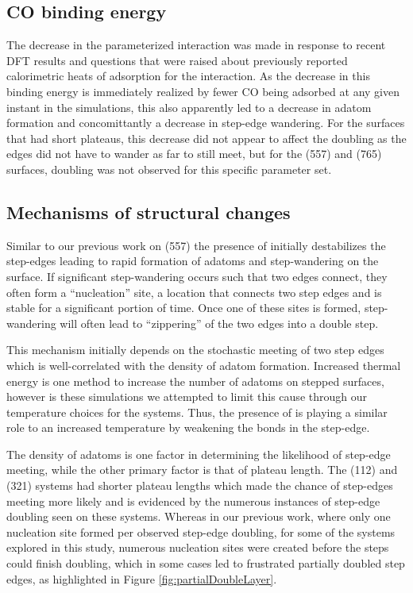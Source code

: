 \subsection{CO binding energy}
The decrease in the parameterized  interaction was made in
response to recent DFT results\citep{Deshlahra:2012aa} and questions that were
raised about previously reported calorimetric heats of adsorption for the
 interaction.\citep{Yeo:1997th} As the decrease in this binding
energy is immediately realized by fewer CO being adsorbed at any given instant
in the simulations, this also apparently led to a decrease in adatom formation
and concomittantly a decrease in step-edge wandering. For the surfaces that had
short plateaus, this decrease did not appear to affect the doubling as the
edges did not have to wander as far to still meet, but for the (557) and (765)
surfaces,  doubling was not observed for this specific parameter set.

\subsection{Mechanisms of structural changes}
Similar to our previous work on  (557) the presence of  initially
destabilizes the step-edges leading to rapid formation of adatoms and
step-wandering on the surface. If significant step-wandering occurs such that
two edges connect, they often form a ``nucleation'' site, a location that
connects two step edges and is stable for a significant portion of time. Once
one of these sites is formed, step-wandering will often lead to ``zippering''
of the two edges into a double step. 

This mechanism initially depends on the stochastic meeting of two step edges
which is well-correlated with the density of adatom formation. Increased
thermal energy is one method to increase the number of adatoms on stepped
surfaces, however is these simulations we attempted to limit this cause through
our temperature choices for the systems. Thus, the presence of  is
playing a similar role to an increased temperature by weakening the
 bonds in the step-edge.

The density of adatoms is one factor in determining the likelihood of step-edge
meeting, while the other primary factor is that of plateau length. The (112)
and (321) systems had shorter plateau lengths which made the chance of
step-edges meeting more likely and is evidenced by the numerous instances of
step-edge doubling seen on these systems. Whereas in our previous work, where
only one nucleation site formed per observed step-edge doubling, for some of
the systems explored in this study, numerous nucleation sites were created
before the steps could finish doubling, which in some cases led to
frustrated partially doubled step edges, as highlighted in Figure
\ref{fig:partialDoubleLayer}.

